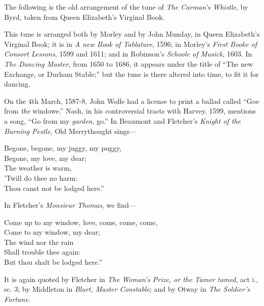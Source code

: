 The following is the old arrangement of the tune of \textit{The Carman’s Whistle},
by Byrd, taken from Queen Elizabeth’s Virginal Book.





This tune is arranged both by Morley and by John Munday, in Queen Elizabeth’s 
Virginal Book; it is in \textit{A new Book of Tablature}, 1596; in Morley’s \textit{First
Booke of Consort Lessons}, 1599 and 1611; and in Robinson’s \textit{Schoole of Musick},
1603. In \textit{The Dancing Master}, from 1650 to 1686, it appears under the title of
“The new Exchange, or Durham Stable;” but the tune is there altered into
 time, to fit it for dancing.

On the 4th March, 1587-8, John Wolfe had a license to print a ballad called
“Goe from \textit{the} windowe.” Nash, in his controversial tracts with Harvey, 1599,
mentions a song, “Go from my \textit{garden}, go.” In Beaumont and Fletcher’s
\textit{Knight of the Burning Pestle}, Old Merrythought sings—
\pagebreak




\settowidth{\versewidth}{Begone, begone, my juggy, my puggy,}
\begin{scverse}
Begone, begone, my juggy, my puggy,\\
Begone, my love, my dear;\\
The weather is warm,\\
’Twill do thee no harm:\\
Thou canst not be lodged here.”
\end{scverse}
In Fletcher’s \textit{Monsieur Thomas}, we find—
\settowidth{\versewidth}{Come up to my window, love, come, come, come,}
\begin{scverse}
\begin{patverse}
Come up to my window, love, come, come, come,\\
Come to my window, my dear;\\
The wind nor the rain\\
Shall trouble thee again:\\
But thou shalt be lodged here.”
\end{patverse}
\end{scverse}
It is again quoted by Fletcher in \textit{The Woman’s Prize, or the Tamer tamed}, act i.,
sc. 3; by Middleton in \textit{Blurt, Master Constable}; and by Otway in \textit{The Soldier’s
Fortune}.

